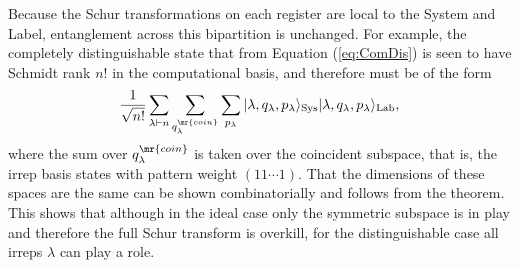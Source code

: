 Because the Schur transformations on each register are local to the System and Label, entanglement across this bipartition is unchanged.
For example, the completely distinguishable state that from Equation (\ref{eq:ComDis}) is seen to have Schmidt rank $n!$ in the computational basis, and therefore must be of the form
\begin{equation}
\frac{1}{\sqrt{n!}} \sum_{\lambda \vdash n} \sum_{q_\lambda^\mr{coin}} \sum_{p_\lambda} |\lambda,q_\lambda,p_\lambda\rangle_{\textrm{Sys}}|\lambda,q_\lambda,p_\lambda\rangle_{\textrm{Lab}},
\label{distinguishable-irreps}
\end{equation}
where the sum over $q_\lambda^\mr{coin}$ is taken over the coincident subspace, that is, the irrep basis states with pattern weight $(11\cdots 1)$.
That the dimensions of these spaces are the same can be shown combinatorially and follows from the theorem.
This shows that although in the ideal case only the symmetric subspace is in play and therefore the full Schur transform is overkill, for the distinguishable case all irreps $\lambda$ can play a role.

